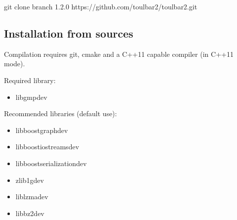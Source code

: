\documentclass[letterpaper,10pt,openany,oneside,english]{sphinxmanual}
\begin{document}
\begin{sphinxVerbatim}[commandchars=\\\{\}]
git clone \PYGZhy{}\PYGZhy{}branch 1.2.0 https://github.com/toulbar2/toulbar2.git
\end{sphinxVerbatim}


\subsection{Installation from sources}
\label{\detokenize{_files/README:installation-from-sources}}\label{\detokenize{_files/README:readme-5}}
\sphinxAtStartPar
Compilation requires git, cmake and a C++\sphinxhyphen{}11 capable compiler (in C++11 mode).

\sphinxAtStartPar
Required library:
\begin{itemize}
\item {} 
\sphinxAtStartPar
libgmp\sphinxhyphen{}dev

\end{itemize}

\sphinxAtStartPar
Recommended libraries (default use):
\begin{itemize}
\item {} 
\sphinxAtStartPar
libboost\sphinxhyphen{}graph\sphinxhyphen{}dev

\item {} 
\sphinxAtStartPar
libboost\sphinxhyphen{}iostreams\sphinxhyphen{}dev

\item {} 
\sphinxAtStartPar
libboost\sphinxhyphen{}serialization\sphinxhyphen{}dev

\item {} 
\sphinxAtStartPar
zlib1g\sphinxhyphen{}dev

\item {} 
\sphinxAtStartPar
liblzma\sphinxhyphen{}dev

\item {} 
\sphinxAtStartPar
libbz2\sphinxhyphen{}dev

\end{itemize}
\end{document}
